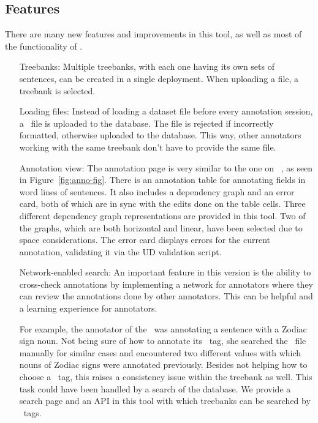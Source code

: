 \subsection{Features}
\label{sec:features}

There are many new features and improvements in this tool, as well as most of the functionality of \boatvone.

\begin{itemize}[before=\normalfont, font=\itshape, align=left]
    \item[Treebanks:]
        Multiple treebanks, with each one having its own sets of sentences, can be created in a single deployment.
        When uploading a file, a treebank is selected.

    \item[Loading files:]
        Instead of loading a dataset file before every annotation session, a \conllu\ file is uploaded to the database.
        The file is rejected if incorrectly formatted, otherwise uploaded to the database.
        This way, other annotators working with the same treebank don't have to provide the same file.

    \item[Annotation view:]
        The annotation page is very similar to the one on \boatvone~\cite{trk2020resources}, as seen in Figure~\ref{fig:anno-fig}.
        There is an annotation table for annotating fields in word lines of sentences.
        It also includes a dependency graph and an error card, both of which are in sync with the edits done on the table cells.
        Three different dependency graph representations are provided in this tool.
        Two of the graphs, which are both horizontal and linear, have been selected due to space considerations.
        The error card displays errors for the current annotation, validating it via the UD validation script.

    \item[Network-enabled search:]
        An important feature in this version is the ability to cross-check annotations by implementing a network for annotators where they can review the annotations done by other annotators.
        This can be helpful and a learning experience for annotators.

        For example, the annotator of the \bountreebank\ was annotating a sentence with a Zodiac sign noun.
        Not being sure of how to annotate its \upos\ tag, she searched the \conllu\ file manually for similar cases and encountered two different values with which nouns of Zodiac signs were annotated previously.
        Besides not helping how to choose a \upos\ tag, this raises a consistency issue within the treebank as well.
        This task could have been handled by a search of the database.
        We provide a search page and an API in this tool with which treebanks can be searched by \ud\ tags.


\end{itemize}
